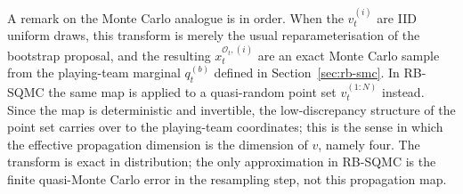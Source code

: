 A remark on the Monte Carlo analogue is in order. When the $v_t^{(i)}$ are IID uniform draws, this transform is merely the usual reparameterisation of the bootstrap proposal, and the resulting $x_t^{\mathcal{O}_t,(i)}$ are an exact Monte Carlo sample from the playing-team marginal $q_t^{(b)}$ defined in Section~\ref{sec:rb-smc}. In RB-SQMC the same map is applied to a quasi-random point set $v_t^{(1:N)}$ instead. Since the map is deterministic and invertible, the low-discrepancy structure of the point set carries over to the playing-team coordinates; this is the sense in which the effective propagation dimension is the dimension of $v$, namely four. The transform is exact in distribution; the only approximation in RB-SQMC is the finite quasi-Monte Carlo error in the resampling step, not this propagation map.
